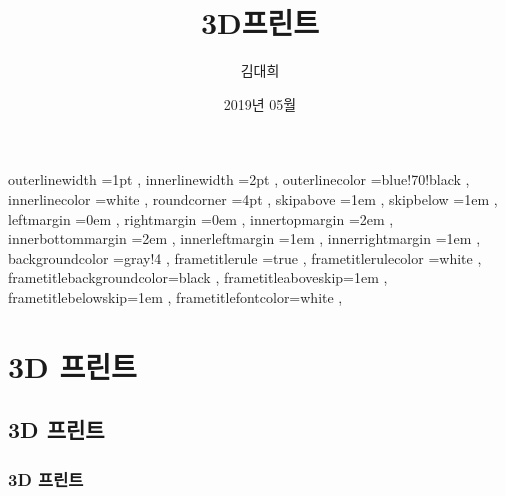 \documentclass[12pt, a4paper, oneside]{book}
\let\stdsection\section
\renewcommand\section{\newpage\stdsection}
\begin{document}
	
			\dominitoc
			\doparttoc			




			\title{3D프린트}
			\author{김대희}
			\date{2019년 05월}
			\maketitle


			\tableofcontents 		%
			\cleardoublepage
			\listoftables 			%





		 {
						outerlinewidth		=1pt			,%
						innerlinewidth		=2pt			,%
						outerlinecolor		=blue!70!black	,%
						innerlinecolor		=white 			,%
						roundcorner			=4pt			,%
						skipabove			=1em 			,%
						skipbelow			=1em 			,%
						leftmargin			=0em			,%
						rightmargin			=0em			,%
						innertopmargin		=2em 			,%
						innerbottommargin 	=2em 			,%
						innerleftmargin		=1em 			,%
						innerrightmargin		=1em 			,%
						backgroundcolor		=gray!4			,%
						frametitlerule		=true 			,%
						frametitlerulecolor	=white			,%
						frametitlebackgroundcolor=black		,%
						frametitleaboveskip=1em 			,%
						frametitlebelowskip=1em 			,%
						frametitlefontcolor=white 			,%
						}



	\part{3D 프린트}
	\noptcrule
	\parttoc				

%
	\chapter{3D 프린트}






%
	\section{3D 프린트}
\end{document}

